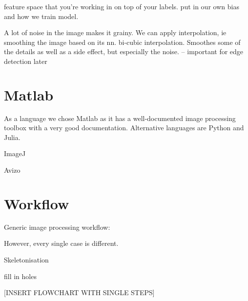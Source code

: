 	feature space that you're working in on top of your labels.
	put in our own bias and how we train model.
	
	A lot of noise in the image makes it grainy. We can apply interpolation, ie smoothing the image based on its nn. bi-cubic interpolation.  Smoothes some of the details as well as a side effect, but especially the noise. -- important for edge detection later


\section{Matlab}

As a language we chose Matlab as it has a well-documented image processing toolbox with a very good documentation. Alternative languages are Python and Julia. 

ImageJ

Avizo

 

\section{Workflow}


Generic image processing workflow:

However, every single case is different. 

Skeletonisation

fill in holes


[INSERT FLOWCHART WITH SINGLE STEPS]

%
%
%
%
%
%

